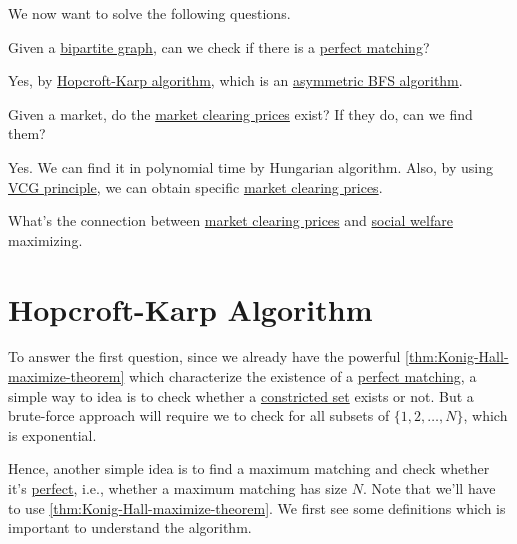 We now want to solve the following questions.
\begin{problem}
Given a \href{https://en.wikipedia.org/wiki/Bipartite_graph}{bipartite graph}, can we check if there is a \hyperref[def:perfect-matching]{perfect matching}?
\end{problem}
\begin{answer}
	Yes, by \hyperref[sec:Hopcroft-Karp-algorithm]{Hopcroft-Karp algorithm}, which is an \underline{asymmetric BFS algorithm}.
\end{answer}

\begin{problem}
Given a market, do the \hyperref[note:market-clearing-prices]{market clearing prices} exist? If they do, can we find them?
\end{problem}
\begin{answer}
	Yes. We can find it in polynomial time by Hungarian algorithm. Also, by using \hyperref[thm:VCG]{VCG principle},
	we can obtain specific \hyperref[note:market-clearing-prices]{market clearing prices}.
\end{answer}

\begin{problem}
What's the connection between \hyperref[note:market-clearing-prices]{market clearing prices} and \hyperref[def:social-welfare]{social welfare}
maximizing.
\end{problem}

\section{Hopcroft-Karp Algorithm}\label{sec:Hopcroft-Karp-algorithm}
To answer the first question, since we already have the powerful \autoref{thm:Konig-Hall-maximize-theorem} which characterize the existence of a
\hyperref[def:perfect-matching]{perfect matching}, a simple way to idea is to check whether a \hyperref[def:constricted-set]{constricted set}
exists or not. But a brute-force approach will require we to check for all subsets of \(\{1, 2, \ldots , N \}\), which is exponential.

Hence, another simple idea is to find a maximum matching and check whether it's \hyperref[def:perfect-matching]{perfect}, i.e.,
whether a maximum matching has size \(N\). Note that we'll have to use \autoref{thm:Konig-Hall-maximize-theorem}. We first see some definitions which is important to
understand the algorithm.

